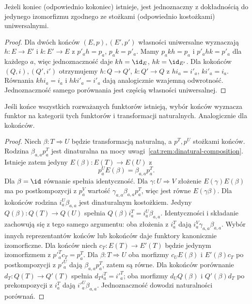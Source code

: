 \begin{stwierdzenie}[Jednoznaczność]\label{cat:prop:end-coend-unique}
Jeżeli koniec (odpowiednio kokoniec) istnieje, jest jednoznaczny z dokładnością do jedynego izomorfizmu zgodnego ze stożkami (odpowiednio kostożkami) uniwersalnymi.
\end{stwierdzenie}
\begin{proof}
Dla dwóch końców $(E,p),(E',p')$ własności uniwersalne wyznaczają $h:E\to E'$ i $k:E'\to E$ z $p'_a h=p_a$, $p_a k=p'_a$. Mamy $p_a kh=p_a$ i $p'_a hk=p'_a$ dla każdego $a$, więc jednoznaczność daje $kh=\id_E$, $hk=\id_{E'}$. Dla kokońców $(Q,i),(Q',i')$ otrzymujemy $h:Q\to Q'$, $k:Q'\to Q$ z $h i_a=i'_a$, $k i'_a=i_a$. Równania $kh i_a=i_a$ i $hk i'_a=i'_a$ dają analogicznie wzajemną odwrotność. Jednoznaczność samego porównania jest częścią własności uniwersalnej.
\end{proof}
\begin{stwierdzenie}[Funktorialność]\label{cat:prop:end-coend-functorial}
Jeśli końce wszystkich rozważanych funktorów istnieją, wybór końców wyznacza funktor na kategorii tych funktorów i transformacji naturalnych. Analogicznie dla kokońców.
\end{stwierdzenie}
\begin{proof}
Niech $\beta:T\Rightarrow U$ będzie transformacją naturalną, a $p^T,p^U$ stożkami końców. Rodzina $\beta_{a,a}p^T_a$ jest dinaturalna na mocy uwagi~\ref{cat:rem:dinatural-composition}. Istnieje zatem jedyny $E(\beta):E(T)\to E(U)$ z
\[
 p^U_a E(\beta)=\beta_{a,a}p^T_a.
\]
Dla $\beta=\id$ równanie spełnia identyczność. Dla $\gamma:U\Rightarrow V$ złożenie $E(\gamma)E(\beta)$ ma po postkompozycji z $p^V_a$ wartość $\gamma_{a,a}\beta_{a,a}p^T_a$, więc jest równe $E(\gamma\beta)$. Dla kokońców rodzina $i^U_a\beta_{a,a}$ jest dinaturalnym kostożkiem. Jedyny $Q(\beta):Q(T)\to Q(U)$ spełnia $Q(\beta)i^T_a=i^U_a\beta_{a,a}$. Identyczności i składanie zachowują się z tego samego argumentu: oba złożenia z $i^T_a$ dają $i^V_a\gamma_{a,a}\beta_{a,a}$. Wybór innych reprezentantów końców lub kokońców daje funktory kanonicznie izomorficzne. Dla końców niech $c_T:E(T)\to E'(T)$ będzie jedynym izomorfizmem z $p'^T_a c_T=p^T_a$. Dla $\beta:T\Rightarrow U$ oba morfizmy $c_U E(\beta)$ i $E'(\beta)c_T$ po postkompozycji z $p'^U_a$ dają $\beta_{a,a}p^T_a$, zatem są równe. Dla kokońców porównanie $d_T:Q(T)\to Q'(T)$ spełnia $d_T i^T_a=i'^T_a$; oba morfizmy $d_U Q(\beta)$ i $Q'(\beta)d_T$ po prekompozycji z $i^T_a$ dają $i'^U_a\beta_{a,a}$. Jednoznaczność dowodzi naturalności porównań.
\end{proof}

